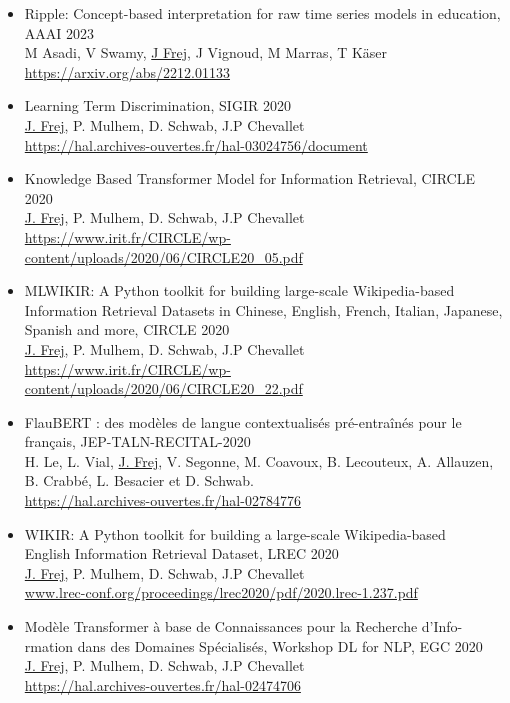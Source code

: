 \begin{itemize}
        \item Ripple: Concept-based interpretation for raw time series models in education, \textcolor{maincol}{AAAI 2023}\\M Asadi, V Swamy, \underline{J Frej}, J Vignoud, M Marras, T Käser \\\url{https://arxiv.org/abs/2212.01133}
        \item Learning Term Discrimination, \textcolor{maincol}{SIGIR 2020}\\\underline{J. Frej}, P. Mulhem, D. Schwab, J.P Chevallet \\\url{https://hal.archives-ouvertes.fr/hal-03024756/document}
        \item Knowledge Based Transformer Model for Information Retrieval, \textcolor{maincol}{CIRCLE 2020}\\\underline{J. Frej}, P. Mulhem, D. Schwab, J.P Chevallet\\\url{https://www.irit.fr/CIRCLE/wp-content/uploads/2020/06/CIRCLE20_05.pdf}
        \item MLWIKIR: A Python toolkit for building large-scale Wikipedia-based Information Retrieval Datasets in Chinese, English, French, Italian, Japanese, Spanish and more, \textcolor{maincol}{CIRCLE 2020}\\\underline{J. Frej}, P. Mulhem, D. Schwab, J.P Chevallet\\ \url{https://www.irit.fr/CIRCLE/wp-content/uploads/2020/06/CIRCLE20_22.pdf}
        \item FlauBERT : des modèles de langue contextualisés pré-entraînés pour le français, \textcolor{maincol}{JEP-TALN-RECITAL-2020}\\H. Le, L. Vial, \underline{J. Frej}, V. Segonne, M. Coavoux, B. Lecouteux, A. Allauzen, B. Crabbé, L. Besacier et D. Schwab.\\ \url{https://hal.archives-ouvertes.fr/hal-02784776} 
        \item WIKIR: A Python toolkit for building a large-scale Wikipedia-based\\ English Information Retrieval Dataset, \textcolor{maincol}{LREC 2020}\\\underline{J. Frej}, P. Mulhem, D. Schwab, J.P Chevallet\\\url{www.lrec-conf.org/proceedings/lrec2020/pdf/2020.lrec-1.237.pdf} 
        \item Modèle Transformer à base de Connaissances pour la Recherche d'Info-\\rmation dans des Domaines Spécialisés, \textcolor{maincol}{Workshop DL for NLP, EGC 2020}\\\underline{J. Frej}, P. Mulhem, D. Schwab, J.P Chevallet\\ \url{https://hal.archives-ouvertes.fr/hal-02474706} 

\end{itemize}
